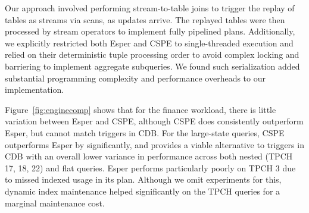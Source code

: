 Our approach involved performing stream-to-table joins to trigger the replay of
tables as streams via scans, as updates arrive. The replayed tables were then
processed by stream operators to implement fully pipelined plans.
Additionally, we explicitly restricted both Esper and CSPE to single-threaded
execution and relied on their deterministic tuple processing order to avoid
complex locking and barriering to implement aggregate subqueries. We found such
serialization added substantial programming complexity and performance overheads
to our implementation.

Figure~\ref{fig:enginecomp} shows that for the finance workload, there is little
variation between Esper and CSPE, although CSPE does consistently outperform
Esper, but cannot match triggers in CDB. For the large-state queries, CSPE
outperforms Esper by significantly, and provides a viable alternative to
triggers in CDB with an overall lower variance in performance across both
nested (TPCH 17, 18, 22) and flat queries. Esper performs particularly poorly on
TPCH 3 due to missed indexed usage in its plan. Although we omit experiments for
this, dynamic index maintenance helped significantly on the TPCH queries for a
marginal maintenance cost.
